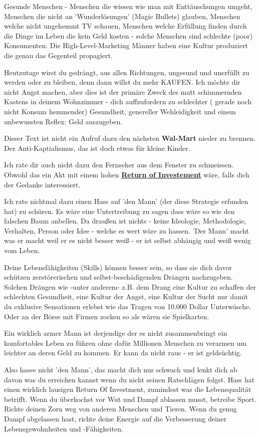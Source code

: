 \documentclass[10pt,a4paper,ngerman,twoside]{article} %
\begin{document}
\begin{multicols}{3}
Gesunde Menschen - Menschen die wissen wie man mit Enttäuschungen umgeht, Menschen die nicht an 'Wunderlösungen' (Magic Bullets) glauben, Menschen welche nicht ungehemmt TV schauen, Menschen welche Erfüllung finden durch die  Dinge im Leben die kein Geld kosten - solche Menschen sind schlechte (poor) Konsumenten. Die High-Level-Marketing Männer haben eine Kultur produziert die genau das Gegenteil propagiert.

Heutzutage wirst du gedrängt, aus allen Richtungen, ungesund und unerfüllt zu werden oder zu bleiben, denn dann willst du mehr KAUFEN. Ich möchte dir nicht Angst machen, aber dies ist der primäre Zweck des matt schimmernden Kastens in deinem Wohnzimmer - dich auffzufordern zu schlechter ( gerade noch nicht Konsum hemmender) Gesundheit, genereller Wehleidigkeit und einem unbewussten Reflex: Geld auszugeben. 

Dieser Text ist nicht ein Aufruf dazu den nächsten \textbf{Wal-Mart} nieder zu brennen. Der Anti-Kaptialismus, das  ist doch etwas für kleine Kinder.

Ich rate dir auch nicht dazu den Fernseher aus dem Fenster zu schmeissen. Obwohl das ein Akt mit einem hohen  \href{https://de.wikipedia.org/wiki/Return_on_Investment}{\textbf{Return of Investement}} wäre, falls dich der Gedanke interessiert. 

Ich rate nichtmal dazu einen Hass auf 'den Mann' (der diese Strategie erfunden hat) zu schüren. Es wäre eine Untertreibung zu sagen dass wäre so wie den falschen Baum anbellen. Da draußen ist nichts - keine Ideologie, Methodologie, Verhalten, Person oder Idee - welche es wert wäre zu hassen. 'Der Mann' macht was er macht weil er es nicht besser weiß - er ist selbst abhängig und weiß wenig vom Leben.

Deine Lebensfähigkeiten (Skills) können besser sein, so dass sie dich davor schützen zerstörerischen und selbst-beschädigenden Drängen nachzugeben. Solchen Drängen wie -unter anderem-  z.B. dem Drang eine Kultur zu schaffen der schlechten Gesundheit, eine Kultur der Angst, eine Kultur der Sucht nur damit du exklusive Sensationen erlebst wie das Tragen von 10.000 Dollar Unterwäsche. Oder an der Börse mit Firmen zocken so als wären sie Spielkarten. 

Ein wirklich armer Mann ist derjendige der es nicht zusammenbringt ein komfortables Leben zu führen ohne dafür Millionen Menschen zu verarmen um leichter an deren Geld zu kommen. Er kann da nicht raus - er ist geldsüchtig.

Also hasse nicht 'den Mann', das macht dich nur schwach und lenkt dich ab davon was du erreichen kannst wenn du nicht seinen Ratschlägen folgst. Hass hat einen wirklich lausigen Return Of Investment, zumindest was die Lebensqualität betrifft. Wenn du überkochst vor Wut und Dampf ablassen musst, betreibe Sport. Richte deinen Zorn weg von anderen Menschen und Tieren. Wenn du genug Dampf abgelassen hast, richte deine Energie auf die Verbesserung deiner Lebensgewohnheiten und -Fähigkeiten.


\end{multicols}
\end{document}
